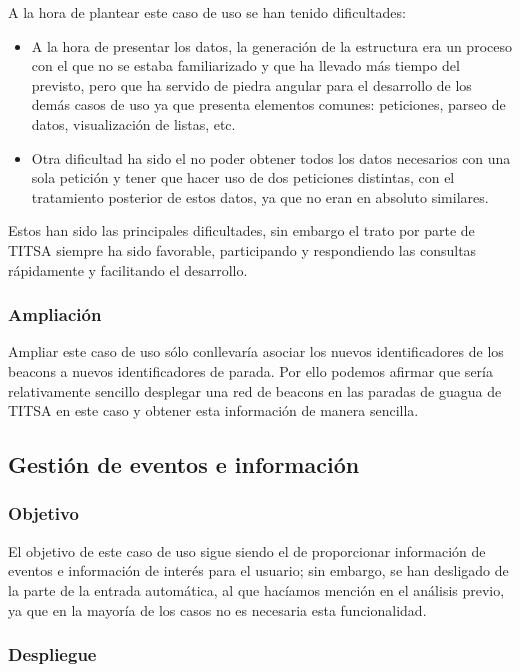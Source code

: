 A la hora de plantear este caso de uso se han tenido dificultades: 

\begin{itemize}
\item A la hora de presentar los datos, la generación de la estructura era un proceso con el que no se estaba familiarizado y que ha llevado más tiempo del previsto, pero que ha servido de piedra angular para el desarrollo de los demás casos de uso ya que presenta elementos comunes: peticiones, parseo de datos, visualización de listas, etc.
\item Otra dificultad ha sido el no poder obtener todos los datos necesarios con una sola petición y tener que hacer uso de dos peticiones distintas, con el tratamiento posterior de estos datos, ya que no eran en absoluto similares.
\end{itemize}

Estos han sido las principales dificultades, sin embargo el trato por parte de TITSA siempre ha sido favorable, participando y respondiendo las consultas rápidamente y facilitando el desarrollo.


\subsubsection{Ampliación}

Ampliar este caso de uso sólo conllevaría asociar los nuevos identificadores de los beacons a nuevos identificadores de parada. Por ello podemos afirmar que sería relativamente sencillo desplegar una red de beacons en las paradas de guagua de TITSA en este caso y obtener esta información de manera sencilla. 


\subsection{Gestión de eventos e información}

\subsubsection{Objetivo}

El objetivo de este caso de uso sigue siendo el de proporcionar información de eventos e información de interés para el usuario; sin embargo, se han desligado de la parte de la entrada automática, al que hacíamos mención en el análisis previo, ya que en la mayoría de los casos no es necesaria esta funcionalidad.  


\subsubsection{Despliegue}


